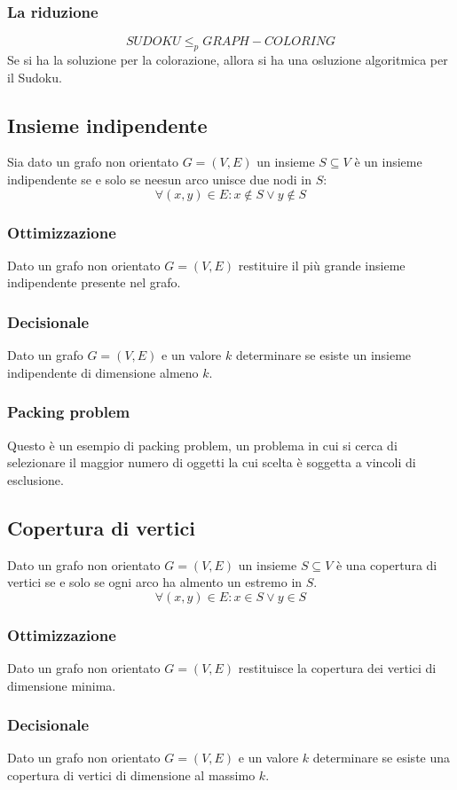 \subsubsection{La riduzione}
$$SUDOKU \le_p GRAPH-COLORING$$
Se si ha la soluzione per la colorazione, allora si ha una osluzione algoritmica per il Sudoku.
\subsection{Insieme indipendente}
Sia dato un grafo non orientato $G=(V, E)$ un insieme $S\subseteq V$ \`e un insieme indipendente se e solo se neesun arco unisce due nodi in $S$:
$$\forall(x, y)\in E: x\not\in S\lor y\not\in S$$
\subsubsection{Ottimizzazione}
Dato un grafo non orientato $G=(V, E)$ restituire il pi\`u grande insieme indipendente presente nel grafo.
\subsubsection{Decisionale}
Dato un grafo $G=(V, E)$ e un valore $k$ determinare se esiste un insieme indipendente di dimensione almeno $k$.
\subsubsection{Packing problem}
Questo \`e un esempio di packing problem, un problema in cui si cerca di selezionare il maggior numero di oggetti la cui scelta \`e soggetta a vincoli di esclusione.
\subsection{Copertura di vertici}
Dato un grafo non orientato $G=(V, E)$ un insieme $S\subseteq V$ \`e una copertura di vertici se e solo se ogni arco ha almento un estremo in $S$.
$$\forall(x, y)\in E: x\in S\lor y\in S$$
\subsubsection{Ottimizzazione}
Dato un grafo non orientato $G=(V, E)$ restituisce la copertura dei vertici di dimensione minima.
\subsubsection{Decisionale}
Dato un grafo non orientato $G=(V, E)$ e un valore $k$ determinare se esiste una copertura di vertici di dimensione al massimo $k$.
